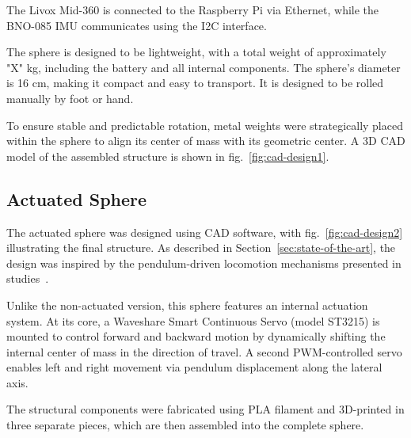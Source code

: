 \documentclass[conference]{IEEEtran}
\begin{document}
The Livox Mid-360 is connected to the Raspberry Pi via Ethernet, while the BNO-085 IMU communicates using the I2C interface. 

The sphere is designed to be lightweight, with a total weight of approximately "X" kg, including the battery and all internal components. The sphere's diameter is 16 cm, making it compact and easy to transport. It is designed to be rolled manually by foot or hand.

To ensure stable and predictable rotation, metal weights were strategically placed within the sphere to align its center of mass with its geometric center. A 3D CAD model of the assembled structure is shown in fig.~\ref{fig:cad-design1}.



\subsection{Actuated Sphere}

The actuated sphere was designed using CAD software, with fig.~\ref{fig:cad-design2} illustrating the final structure. As described in Section~\ref{sec:state-of-the-art}, the design was inspired by the pendulum-driven locomotion mechanisms presented in studies~\cite{roboball, novelsphere}.

Unlike the non-actuated version, this sphere features an internal actuation system. At its core, a Waveshare Smart Continuous Servo (model ST3215) is mounted to control forward and backward motion by dynamically shifting the internal center of mass in the direction of travel. A second PWM-controlled servo enables left and right movement via pendulum displacement along the lateral axis.

The structural components were fabricated using PLA filament and 3D-printed in three separate pieces, which are then assembled into the complete sphere.
\end{document}
